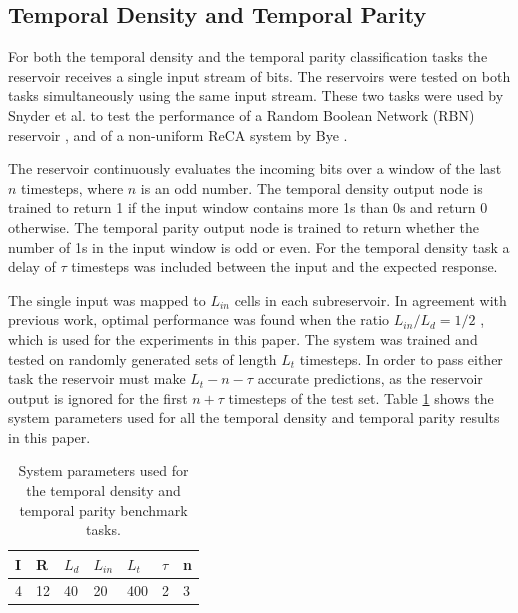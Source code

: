 \documentclass{elsarticle}
\begin{document}
\begin{multicols}{2}
\subsection{Temporal Density and Temporal Parity}
For both the temporal density and the temporal parity classification tasks the 
    reservoir receives a single input stream of bits. The reservoirs were 
    tested on both tasks simultaneously using the same input stream. These two 
    tasks were used by Snyder et al. to test the performance of a Random 
    Boolean Network (RBN) reservoir \cite{snyder2013computational}, and of a 
    non-uniform ReCA system by Bye \cite{bye2016investigation}. \par The 
    reservoir continuously evaluates the incoming bits over a window of the 
    last $n$ timesteps, where $n$ is an odd number. The temporal density output 
    node is trained to return 1 if the input window contains more 1s than 0s 
    and return 0 otherwise. The temporal parity output node is trained to 
    return whether the number of 1s in the input window is odd or even. For the 
    temporal density task a delay of $\tau$ timesteps was included between the 
    input and the expected response. \par The single input was mapped to 
    $L_{in}$ cells in each subreservoir. In agreement with previous work, 
   optimal performance was found when the ratio $L_{in}/L_{d} = 1/2$ 
      \cite{bye2016investigation}, which is used for the experiments in this 
      paper. The system was trained and tested on randomly generated sets of 
      length $L_{t}$ timesteps.  In order to pass either task the reservoir 
      must make $L_{t} - n - \tau$ accurate predictions, as the reservoir 
      output is ignored for the first $n + \tau$ timesteps of the test set.  
      Table \ref{table:temp_settings} shows the system parameters used for all 
      the temporal density and temporal parity results in this paper. 


\begin{table}[H] \centering
\begin{tabular}{|l|l|l|l|l|l|l|}
\hline
\textbf{I} & \textbf{R} & \textbf{$L_{d}$} & \textbf{$L_{in}$} & 
\textbf{$L_{t}$} & \textbf{$\tau$} & \textbf{n}   \\ \hline
4 & 12 & 40 & 20 & 400 & 2 & 3 \\ \hline
\end{tabular}
\caption{System parameters used for the temporal density and temporal parity 
   benchmark tasks.}
\label{table:temp_settings}
\end{table}




\end{multicols}
\end{document}
